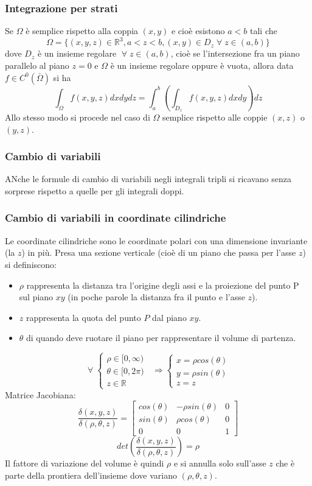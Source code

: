 \subsubsection{Integrazione per strati}
Se $\Omega$ è semplice rispetto alla coppia $(x,y)$ e cioè esistono $a<b$ tali che
\[
    \Omega = \{(x,y,z) \in \mathbb{R}^3, a<z<b, (x,y) \in D_z \;\forall\;z \in(a,b)\}
\]
dove $D_z$ è un insieme regolare $\;\forall\;z \in(a,b)$, cioè se l'intersezione fra un piano parallelo al piano $z=0$ e $\Omega$ è un insieme regolare oppure è vuota, allora data $f \in C^0(\bar{\Omega})$ si ha 
\[
    \int_\Omega f(x,y,z) dxdydz = \int_{a}^{b}\left(\int_{D_z}f(x,y,z)dxdy\right)dz
\]
Allo stesso modo si procede nel caso di $\Omega$ semplice rispetto alle coppie $(x,z)$ o $(y,z)$.
\subsubsection{Cambio di variabili}
ANche le formule di cambio di variabili negli integrali tripli si ricavano senza sorprese rispetto a quelle per gli integrali doppi.
\subsubsection{Cambio di variabili in coordinate cilindriche}
Le coordinate cilindriche sono le coordinate polari con una dimensione invariante (la $z$) in più.\newline
\newline
Presa una sezione verticale (cioè di un piano che passa per l'asse $z$) si definiscono:
\begin{itemize}
    \item $\rho$ rappresenta la distanza tra l'origine degli assi e la proiezione del punto P sul piano $xy$ (in poche parole la distanza fra il punto e l'asse $z$).
    \item $z$ rappresenta la quota del punto $P$ dal piano $xy$.
    \item $\theta$ di quando deve ruotare il piano per rappresentare il volume di partenza.
\end{itemize}
\[
    \;\forall\; \begin{cases}
        \rho \in [0,\infty)\\
        \theta \in [0,2\pi)\\
        z \in \mathbb{R}
    \end{cases} \;\; \Longrightarrow \begin{cases}
        x = \rho cos(\theta)\\
        y = \rho sin(\theta)\\
        z = z
    \end{cases}
\]
Matrice Jacobiana:
\[
    \frac{\delta(x,y,z)}{\delta(\rho,\theta,z)} = \left[
    \begin{matrix}
        cos(\theta) & -\rho sin(\theta) & 0\\ 
        sin(\theta) & \rho cos(\theta) & 0 \\ 
        0 & 0 & 1
    \end{matrix}\right]
\]
\[
    det\left(\frac{\delta(x,y,z)}{\delta(\rho,\theta,z)}\right) = \rho 
\]
Il fattore di variazione del volume è quindi $\rho$ e si annulla solo sull'asse $z$ che è parte della prontiera dell'insieme dove variano $(\rho,\theta,z)$.
